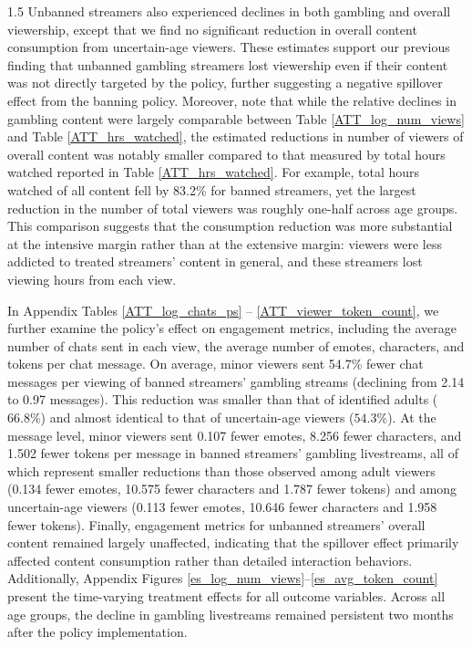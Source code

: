 \documentclass[a4paper,12pt]{article}
\begin{document}
\begin{spacing}{1.5}
Unbanned streamers also experienced declines in both gambling and overall viewership, except that we find no significant reduction in overall content consumption from uncertain-age viewers. These estimates support our previous finding that unbanned gambling streamers lost viewership even if their content was not directly targeted by the policy, further suggesting a negative spillover effect from the banning policy. Moreover, note that while the relative declines in gambling content were largely comparable between Table \ref{ATT_log_num_views} and Table \ref{ATT_hrs_watched}, the estimated reductions in number of viewers of overall content was notably smaller compared to that measured by total hours watched reported in Table \ref{ATT_hrs_watched}. For example, total hours watched of all content fell by 83.2\% for banned streamers, yet the largest reduction in the number of total viewers was roughly one-half across age groups. This comparison suggests that the consumption reduction was more substantial at the intensive margin rather than at the extensive margin: viewers were less addicted to treated streamers' content in general, and these streamers lost viewing hours from each view.

In Appendix Tables \ref{ATT_log_chats_ps} -- \ref{ATT_viewer_token_count}, we further examine the policy's effect on engagement metrics, including the average number of chats sent in each view, the average number of emotes, characters, and tokens per chat message. On average, minor viewers sent 54.7\% fewer chat messages per viewing of banned streamers' gambling streams (declining from 2.14 to 0.97 messages). This reduction was smaller than that of identified adults ($66.8\%$) and almost identical to that of uncertain-age viewers ($54.3\%$). At the message level, minor viewers sent 0.107 fewer emotes, 8.256 fewer characters, and 1.502 fewer tokens per message in banned streamers' gambling livestreams, all of which represent smaller reductions than those observed among adult viewers (0.134 fewer emotes, 10.575 fewer characters and 1.787 fewer tokens) and among uncertain-age viewers (0.113 fewer emotes, 10.646 fewer characters and 1.958 fewer tokens). Finally, engagement metrics for unbanned streamers’ overall content remained largely unaffected, indicating that the spillover effect primarily affected content consumption rather than detailed interaction behaviors. Additionally, Appendix Figures \ref{es_log_num_views}–\ref{es_avg_token_count} present the time-varying treatment effects for all outcome variables. Across all age groups, the decline in gambling livestreams remained persistent two months after the policy implementation.


\end{spacing}
\end{document}
